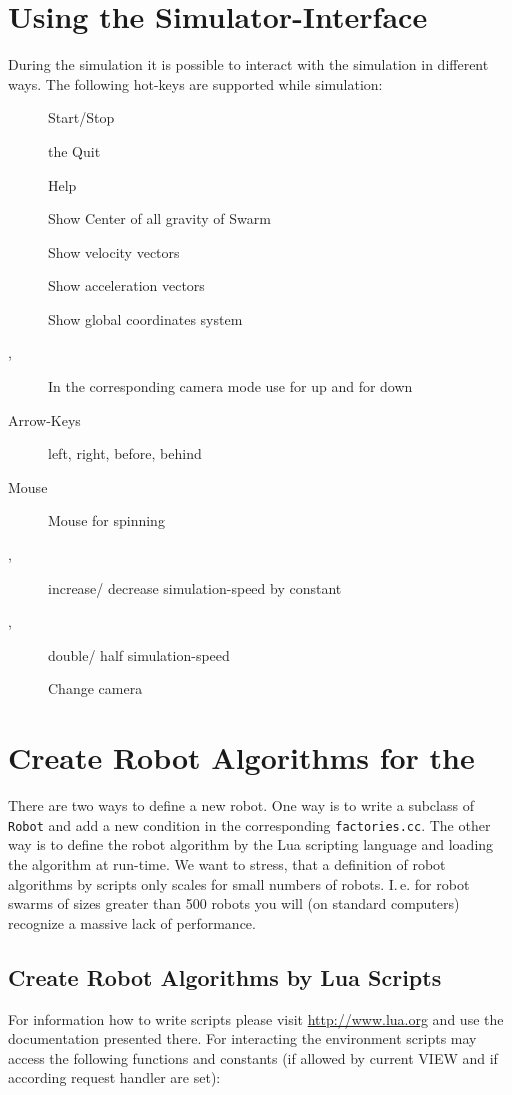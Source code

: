 \documentclass[a4paper,halfparskip,11pt,twoside]{scrartcl}
\begin{document}
\section{Using the Simulator-Interface}
During the simulation it is possible to interact with the simulation in different ways. The following hot-keys are supported while simulation:

\begin{description}
	\item [] Start/Stop
	\item [] the Quit \RSS\
	\item [] Help
	\item [] Show Center of all gravity of Swarm
	\item [] Show velocity vectors
	\item [] Show acceleration vectors
	\item [] Show global coordinates system
	\item [,] In the corresponding camera mode use  for up  and  for down%
	\item [Arrow-Keys] left, right, before, behind
	\item [Mouse] Mouse for spinning
	\item [\fbox{\tt +}, \fbox{\tt -}] increase/ decrease simulation-speed by constant
	\item [\fbox{\tt *},\fbox{\tt /}] double/ half simulation-speed
	\item [] Change camera
\end{description}

\section{Create Robot Algorithms for the \RSS}
There are two ways to define a new robot. One way is to write a subclass of \texttt{Robot} and add a new condition in the corresponding \texttt{factories.cc}. The other way is to define the robot algorithm by the {\sffamily Lua} scripting language and loading the algorithm at run-time. We want to stress, that a definition of robot algorithms by \Lua scripts only scales for small numbers of robots. I.\,e. for robot swarms of sizes greater than 500 robots you will (on standard computers) recognize a massive lack of performance.

\subsection{Create Robot Algorithms by Lua Scripts}
For information how to write \Lua scripts please visit \url{http://www.lua.org} and use the documentation presented there. For interacting the environment \Lua scripts may access the following functions and constants (if allowed by current VIEW and if according request handler are set):
\end{document}
